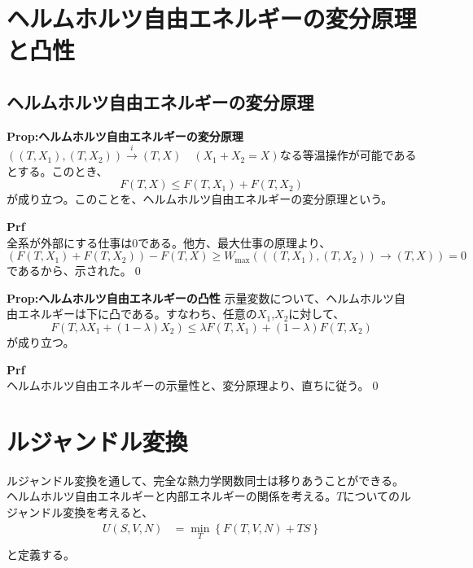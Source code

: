 \documentclass[a4paper,11pt]{jsarticle}
\numberwithin{equation}{section}
\begin{document}
\section{ヘルムホルツ自由エネルギーの変分原理と凸性}
\subsection{ヘルムホルツ自由エネルギーの変分原理}
\begin{itembox}[l]{\textbf{Prop:ヘルムホルツ自由エネルギーの変分原理}}
    $((T,X_1),(T,X_2)) \xrightarrow{i} (T,X)\quad (X_1 + X_2 =X)$なる等温操作が可能であるとする。このとき、
    \begin{equation}
        F(T,X) \leq F(T,X_1)+F(T,X_2)
    \end{equation}
    が成り立つ。このことを、ヘルムホルツ自由エネルギーの変分原理という。
\end{itembox}
\textbf{Prf}\\
全系が外部にする仕事は0である。他方、最大仕事の原理より、
\begin{equation}
    (F(T,X_1)+F(T,X_2)) - F(T,X) \geq W_{{\text{max}}}(((T,X_1),(T,X_2))\rightarrow (T,X)) = 0
\end{equation}
であるから、示された。\qed\\

\begin{itembox}[l]{\textbf{Prop:ヘルムホルツ自由エネルギーの凸性}}
    示量変数について、ヘルムホルツ自由エネルギーは下に凸である。すなわち、任意の$X_1$,$X_2$に対して、
    \begin{equation}
        F(T,\lambda X_1 + (1-\lambda)X_2) \leq \lambda F(T,X_1) + (1-\lambda)F(T,X_2)
    \end{equation}
    が成り立つ。
\end{itembox}
\textbf{Prf}\\
ヘルムホルツ自由エネルギーの示量性と、変分原理より、直ちに従う。\qed\\

\section{ルジャンドル変換}
ルジャンドル変換を通して、完全な熱力学関数同士は移りあうことができる。\\

ヘルムホルツ自由エネルギーと内部エネルギーの関係を考える。$T$についてのルジャンドル変換を考えると、
\begin{align}
    U(S,V,N) &= \min_{T} \left\{ F(T,V,N) + TS \right\}\\
\end{align}
と定義する。\\
\end{document}
